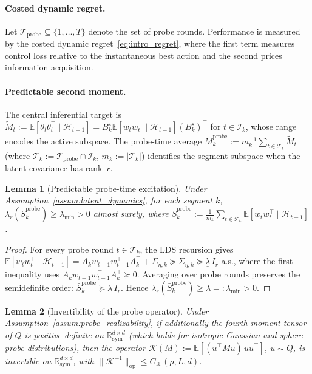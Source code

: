 \documentclass[11pt]{article}
\newcommand{\E}{\mathbb{E}}
\newcommand{\op}{\mathrm{op}}
\newcommand{\cH}{\mathcal{H}}
\newcommand{\cT}{\mathcal{T}}
\newcommand{\cI}{\mathcal{I}}
\newcommand{\cTprobe}{\mathcal{T}_{\mathrm{probe}}}
\newcommand{\Rsy}{\mathbb{R}^{d\times d}_{\mathrm{sym}}}
\newtheorem{lemma}{Lemma}
\begin{document}
\paragraph{Costed dynamic regret.}
Let $\cTprobe\subseteq\{1,\ldots,T\}$ denote the set of probe rounds.
Performance is measured by the costed dynamic regret~\eqref{eq:intro_regret},
where the first term measures control loss relative to the instantaneous best action
and the second prices information acquisition.

\paragraph{Predictable second moment.}
The central inferential target is
$\widetilde{M}_t := \E[\theta_t\theta_t^\top\mid\cH_{t-1}]
= B_k^\star\E[w_tw_t^\top\mid\cH_{t-1}](B_k^\star)^\top$ for $t\in\cI_k$,
whose range encodes the active subspace.
The probe-time average
$\bar{M}_k^{\mathrm{probe}} := m_k^{-1}\sum_{t\in\cT_k}\widetilde{M}_t$
(where $\cT_k:=\cTprobe\cap\cI_k$, $m_k:=|\cT_k|$) identifies the segment
subspace when the latent covariance has rank~$r$.

\begin{lemma}[Predictable probe-time excitation]
\label{lem:probe_excitation}
Under Assumption~\ref{assum:latent_dynamics}, for each segment $k$,
$\lambda_r(\bar{S}_k^{\mathrm{probe}})\ge\lambda_{\min}>0$ almost surely,
where $\bar{S}_k^{\mathrm{probe}}:=\frac{1}{m_k}\sum_{t\in\cT_k}
\E[w_tw_t^\top\mid\cH_{t-1}]$.
\end{lemma}

\begin{proof}
For every probe round $t\in\cT_k$, the LDS recursion gives
$\E[w_tw_t^\top\mid\cH_{t-1}]
= A_k w_{t-1}w_{t-1}^\top A_k^\top + \Sigma_{\eta,k}
\succeq\Sigma_{\eta,k}\succeq\underline{\lambda}\,I_r$ a.s.,
where the first inequality uses $A_k w_{t-1}w_{t-1}^\top A_k^\top\succeq 0$.
Averaging over probe rounds preserves the semidefinite order:
$\bar{S}_k^{\mathrm{probe}}\succeq\underline{\lambda}\,I_r$.
Hence $\lambda_r(\bar{S}_k^{\mathrm{probe}})\ge\underline{\lambda}=:\lambda_{\min}>0$.
\end{proof}

\begin{lemma}[Invertibility of the probe operator]
\label{lem:K_invertible}
Under Assumption~\ref{assum:probe_realizability}, if additionally the fourth-moment
tensor of $Q$ is positive definite on $\Rsy$ (which holds for isotropic Gaussian
and sphere probe distributions), then the operator
$\mathcal{K}(M):=\E[(u^\top Mu)\,uu^\top]$, $u\sim Q$, is invertible on $\Rsy$,
with $\|\mathcal{K}^{-1}\|_{\op}\le C_{\mathcal{K}}(\rho,L,d)$.
\end{lemma}
\end{document}
